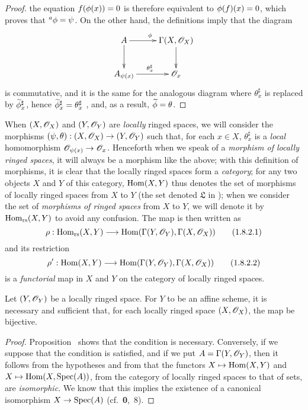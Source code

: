 \begin{proof}
the equation $f(\phi(x))=0$ is therefore equivalent to $\phi(f)(x)=0$, which proves that ${}^a\phi=\psi$.
On the other hand, the definitions imply that the diagram
\[
  \xymatrix{
    A\ar[r]^\vphi\ar[d] &
    \Gamma(X,\sh{O}_X)\ar[d]\\
    A_{\psi(x)}\ar[r]^{\theta_x^\sharp} &
    \sh{O}_x
  }
\]
is commutative, and it is the same for the analogous diagram where $\theta_x^\sharp$ is replaced by $\widetilde{\phi}_x^\sharp$, hence $\widetilde{\phi}_x^\sharp=\theta_x^\sharp$ , and, as a result, $\widetilde{\phi}=\theta$.
\end{proof}

\begin{env}[1.8.2]
\label{I.1.8.2}
When $(X,\mathscr{O}_X)$ and $(Y,\mathscr{O}_Y)$ are \emph{locally} ringed spaces, we will consider the morphisms $(\psi,\theta):(X,\sh{O}_X)\to(Y,\sh{O}_Y)$ such that, for each $x\in X$, $\theta_x^\sharp$ is a \emph{local} homomorphism $\sh{O}_{\psi(x)}\to\sh{O}_x$.
Henceforth when we speak
of a \emph{morphism of locally ringed spaces}, it will always be a morphism like the above;
with this definition of morphisms, it is clear that the locally ringed spaces form a \emph{category};
for any two objects $X$ and $Y$ of this category, $\operatorname{Hom}(X,Y)$ thus denotes the set of morphisms of locally ringed spaces from $X$ to $Y$ (the set denoted $\mathfrak{L}$ in );
when we consider the set of \emph{morphisms of ringed spaces} from $X$ to $Y$, we will denote it by $\operatorname{Hom}_\text{rs}(X,Y)$ to avoid any confusion.
The map  is then written as
\[
  \label{I.1.8.2.1}
  \rho:\Hom_\text{rs}(X,Y)\to\Hom(\Gamma(Y,\sh{O}_Y),\Gamma(X,\sh{O}_X))
  \tag{1.8.2.1}
\]
and its restriction
\[
  \label{I.1.8.2.2}
  \rho':\Hom(X,Y)\to\Hom(\Gamma(Y,\sh{O}_Y),\Gamma(X,\sh{O}_X))
  \tag{1.8.2.2}
\]
is a \emph{functorial} map in $X$ and $Y$ on the category of locally ringed spaces.
\end{env}

\begin{corollary}[1.8.3]
\label{I.1.8.3}
Let $(Y,\mathscr{O}_Y)$ be a locally ringed space.
For $Y$ to be an affine scheme, it is necessary and sufficient that, for each locally ringed space $(X,\mathscr{O}_X)$, the map  be bijective.
\end{corollary}

\begin{proof}
Proposition~ shows that the condition is necessary.
Conversely, if we suppose that the condition is satisfied, and if we put $A=\Gamma(Y,\mathscr{O}_Y)$, then it follows from the hypotheses and from  that the functors $X\mapsto\Hom(X,Y)$ and $X\mapsto\Hom(X,\Spec(A))$, from the category of locally ringed spaces to that of sets, are \emph{isomorphic}.
We know that this implies the existence of a canonical isomorphism $X\to\Spec(A)$ (cf.~\textbf{0},~8).
\end{proof}

